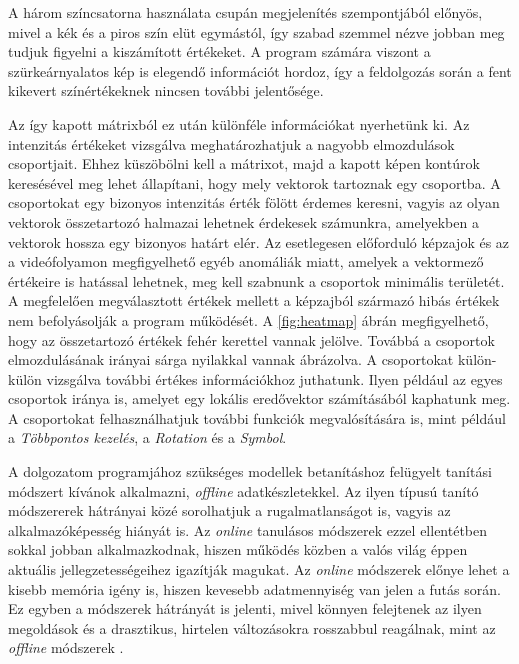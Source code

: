 A három színcsatorna használata csupán megjelenítés szempontjából előnyös, mivel a kék és a piros szín elüt egymástól, így szabad szemmel nézve jobban meg tudjuk figyelni a kiszámított értékeket. A program számára viszont a szürkeárnyalatos kép is elegendő információt hordoz, így a feldolgozás során a fent kikevert színértékeknek nincsen további jelentősége.

Az így kapott mátrixból ez után különféle információkat nyerhetünk ki. Az intenzitás értékeket vizsgálva meghatározhatjuk a nagyobb elmozdulások csoportjait. Ehhez küszöbölni kell a mátrixot, majd a kapott képen kontúrok keresésével meg lehet állapítani, hogy mely vektorok tartoznak egy csoportba. A csoportokat egy bizonyos intenzitás érték fölött érdemes keresni, vagyis az olyan vektorok összetartozó halmazai lehetnek érdekesek számunkra, amelyekben a vektorok hossza egy bizonyos határt elér. Az esetlegesen előforduló képzajok és az a videófolyamon megfigyelhető egyéb anomáliák miatt, amelyek a vektormező értékeire is hatással lehetnek, meg kell szabnunk a csoportok minimális területét. A megfelelően megválasztott értékek mellett a képzajból származó hibás értékek nem befolyásolják a program működését.
A \ref{fig:heatmap} ábrán megfigyelhető, hogy az összetartozó értékek fehér kerettel vannak jelölve. Továbbá a csoportok elmozdulásának irányai sárga nyilakkal vannak ábrázolva. A csoportokat külön-külön vizsgálva további értékes információkhoz juthatunk. Ilyen például az egyes csoportok iránya is, amelyet egy lokális eredővektor számításából kaphatunk meg. A csoportokat felhasználhatjuk további funkciók megvalósítására is, mint például a \textit{Többpontos kezelés}, a \textit{Rotation} és a \textit{Symbol}.


A dolgozatom programjához szükséges modellek betanításhoz felügyelt tanítási módszert kívánok alkalmazni, \textit{offline} adatkészletekkel. Az ilyen típusú tanító módszererek hátrányai közé sorolhatjuk a rugalmatlanságot is, vagyis az alkalmazóképesség hiányát is. Az \textit{online} tanulásos módszerek ezzel ellentétben sokkal jobban alkalmazkodnak, hiszen működés közben a valós világ éppen aktuális jellegzetességeihez igazítják magukat. Az \textit{online} módszerek előnye lehet a kisebb memória igény is, hiszen kevesebb adatmennyiség van jelen a futás során. Ez egyben a módszerek hátrányát is jelenti, mivel könnyen felejtenek az ilyen megoldások és a drasztikus, hirtelen változásokra rosszabbul reagálnak, mint az \textit{offline} módszerek \cite{geron2019hands}.

